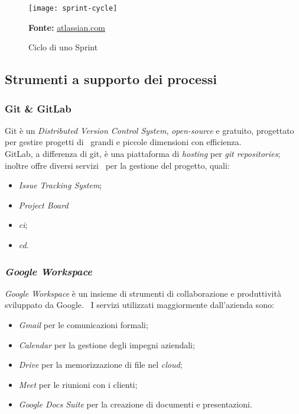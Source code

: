 \vspace{20pt}
  \begin{figure}[!ht]
    \begin{center}
      \texttt{[image: sprint-cycle]}
      \caption{Ciclo di uno Sprint}
      \textbf{Fonte:} \href{https://www.atlassian.com}{atlassian.com}
    \end{center}
  \end{figure}
\vspace{20pt} 

\subsection{Strumenti a supporto dei processi}

\subsubsection{Git \& GitLab}
Git è un \emph{Distributed Version Control System}, \emph{open-source} e gratuito, progettato per gestire progetti di \
grandi e piccole dimensioni con efficienza. \\

GitLab, a differenza di git, è una piattaforma di \emph{hosting} per \emph{git repositories}; inoltre offre diversi servizi \
per la gestione del progetto, quali:

\begin{itemize}
  \item \emph{Issue Tracking System};
  \item \emph{Project Board}
  \item \emph{\acrfull{ci}};
  \item \emph{\acrfull{cd}}.
\end{itemize}

\subsubsection{\emph{Google Workspace}}
\emph{Google Workspace} è un insieme di strumenti di collaborazione e produttività sviluppato da Google. \
I servizi utilizzati maggiormente dall'azienda sono:

\begin{itemize}
  \item \emph{Gmail} per le comunicazioni formali;
  \item \emph{Calendar} per la gestione degli impegni aziendali;
  \item \emph{Drive} per la memorizzazione di file nel \emph{cloud};
  \item \emph{Meet} per le riunioni con i clienti;
  \item \emph{Google Docs Suite} per la creazione di documenti e presentazioni.
\end{itemize}

